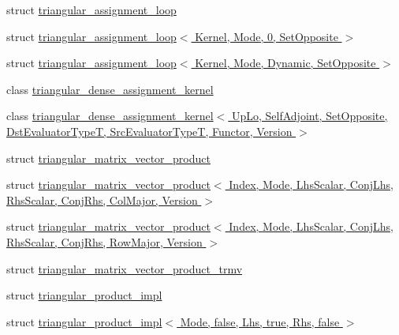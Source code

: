 \begin{DoxyCompactItemize}
struct \hyperlink{struct_eigen_1_1internal_1_1triangular__assignment__loop}{triangular\+\_\+assignment\+\_\+loop}
\item 
struct \hyperlink{struct_eigen_1_1internal_1_1triangular__assignment__loop_3_01_kernel_00_01_mode_00_010_00_01_set_opposite_01_4}{triangular\+\_\+assignment\+\_\+loop$<$ Kernel, Mode, 0, Set\+Opposite $>$}
\item 
struct \hyperlink{struct_eigen_1_1internal_1_1triangular__assignment__loop_3_01_kernel_00_01_mode_00_01_dynamic_00_01_set_opposite_01_4}{triangular\+\_\+assignment\+\_\+loop$<$ Kernel, Mode, Dynamic, Set\+Opposite $>$}
\item 
class \hyperlink{class_eigen_1_1internal_1_1triangular__dense__assignment__kernel}{triangular\+\_\+dense\+\_\+assignment\+\_\+kernel}
\item 
class \hyperlink{class_eigen_1_1internal_1_1triangular__dense__assignment__kernel_3_01_up_lo_00_01_self_adjoint_0bf432100a6648c0f02715a71126a9f44}{triangular\+\_\+dense\+\_\+assignment\+\_\+kernel$<$ Up\+Lo, Self\+Adjoint, Set\+Opposite, Dst\+Evaluator\+Type\+T, Src\+Evaluator\+Type\+T, Functor, Version $>$}
\item 
struct \hyperlink{struct_eigen_1_1internal_1_1triangular__matrix__vector__product}{triangular\+\_\+matrix\+\_\+vector\+\_\+product}
\item 
struct \hyperlink{struct_eigen_1_1internal_1_1triangular__matrix__vector__product_3_01_index_00_01_mode_00_01_lhs_ba3c1ba3cb379196807b17d99fce4e08}{triangular\+\_\+matrix\+\_\+vector\+\_\+product$<$ Index, Mode, Lhs\+Scalar, Conj\+Lhs, Rhs\+Scalar, Conj\+Rhs, Col\+Major, Version $>$}
\item 
struct \hyperlink{struct_eigen_1_1internal_1_1triangular__matrix__vector__product_3_01_index_00_01_mode_00_01_lhs_ba3b9cdc80cdaeff44c1d1ed32cbe15b}{triangular\+\_\+matrix\+\_\+vector\+\_\+product$<$ Index, Mode, Lhs\+Scalar, Conj\+Lhs, Rhs\+Scalar, Conj\+Rhs, Row\+Major, Version $>$}
\item 
struct \hyperlink{struct_eigen_1_1internal_1_1triangular__matrix__vector__product__trmv}{triangular\+\_\+matrix\+\_\+vector\+\_\+product\+\_\+trmv}
\item 
struct \hyperlink{struct_eigen_1_1internal_1_1triangular__product__impl}{triangular\+\_\+product\+\_\+impl}
\item 
struct \hyperlink{struct_eigen_1_1internal_1_1triangular__product__impl_3_01_mode_00_01false_00_01_lhs_00_01true_00_01_rhs_00_01false_01_4}{triangular\+\_\+product\+\_\+impl$<$ Mode, false, Lhs, true, Rhs, false $>$}

\end{DoxyCompactItemize}

